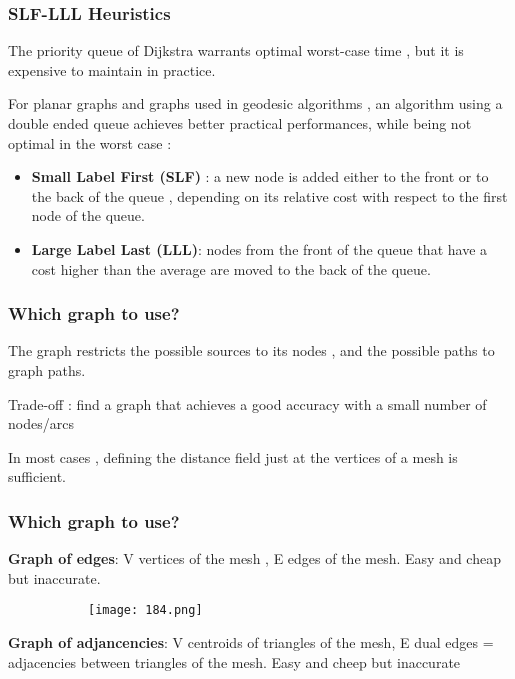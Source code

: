 \documentclass{article}
\begin{document}
\subsubsection{SLF-LLL Heuristics}

The priority queue of Dijkstra warrants optimal worst-case time , but it is expensive to maintain in practice.

For planar graphs and graphs used in geodesic algorithms , an algorithm using a double ended queue achieves better practical performances, while being not optimal in the worst case :

\begin{itemize}
    \item \textbf{Small Label First (SLF)} : a new node is added either to the front or to the back of the queue , depending on its relative cost with respect to the first node of the queue.
    \item \textbf{Large Label Last (LLL)}: nodes from the front of the queue that have a cost higher than the average are moved to the back of the queue.
\end{itemize}

\subsubsection{Which graph to use?}

The graph restricts the possible sources to its nodes , and the possible paths to graph paths.

Trade-off : find a graph that achieves a good accuracy with a small number of nodes/arcs

In most cases , defining the distance field just at the vertices of a mesh is sufficient.


\subsubsection{Which graph to use?}

\textbf{Graph of edges}: V vertices of the mesh , E edges of the mesh. Easy and cheap but inaccurate.

   \begin{figure}[ht!]
  \centering
  \begin{subfigure}[b]{0.3\linewidth}
    \texttt{[image: 184.png]}
  \end{subfigure}
\end{figure}

\textbf{Graph of adjancencies}: V centroids of triangles of the mesh, E dual edges = adjacencies between triangles of the mesh. Easy and cheep but inaccurate
\end{document}
